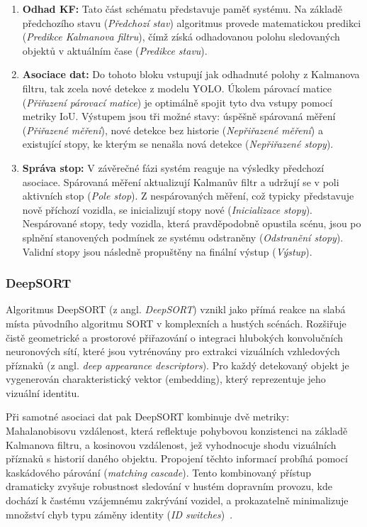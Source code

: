 \documentclass[male,czech,api_bc]{kitheses}
\begin{document}
\begin{enumerate}
    \item \textbf{Odhad KF:} Tato část schématu představuje paměť systému. Na základě předchozího stavu (\textit{Předchozí stav}) algoritmus provede matematickou predikci (\textit{Predikce Kalmanova filtru}), čímž získá odhadovanou polohu sledovaných objektů v aktuálním čase (\textit{Predikce stavu}).
    \item \textbf{Asociace dat:} Do tohoto bloku vstupují jak odhadnuté polohy z Kalmanova filtru, tak zcela nové detekce z modelu YOLO. Úkolem párovací matice (\textit{Přiřazení párovací matice}) je optimálně spojit tyto dva vstupy pomocí metriky \acs{IoU}. Výstupem jsou tři možné stavy: úspěšně spárovaná měření (\textit{Přiřazené měření}), nové detekce bez historie (\textit{Nepřiřazené měření}) a existující stopy, ke kterým se nenašla nová detekce (\textit{Nepřiřazené stopy}).
    \item \textbf{Správa stop:} V závěrečné fázi systém reaguje na výsledky předchozí asociace. Spárovaná měření aktualizují Kalmanův filtr a udržují se v poli aktivních stop (\textit{Pole stop}). Z nespárovaných měření, což typicky představuje nově příchozí vozidla, se inicializují stopy nové (\textit{Inicializace stopy}). Nespárované stopy, tedy vozidla, která pravděpodobně opustila scénu, jsou po splnění stanovených podmínek ze systému odstraněny (\textit{Odstranění stopy}). Validní stopy jsou následně propuštěny na finální výstup (\textit{Výstup}).
\end{enumerate}

\subsubsection{DeepSORT}
Algoritmus DeepSORT (z angl. \textit{\acl{DeepSORT}}) vznikl jako přímá reakce na slabá místa původního algoritmu SORT v komplexních a hustých scénách. Rozšiřuje čistě geometrické a prostorové přiřazování o integraci hlubokých konvolučních neuronových sítí, které jsou vytrénovány pro extrakci vizuálních vzhledových příznaků (z angl. \textit{deep appearance descriptors}). Pro každý detekovaný objekt je vygenerován charakteristický vektor (embedding), který reprezentuje jeho vizuální identitu.

Při samotné asociaci dat pak DeepSORT kombinuje dvě metriky: Mahalanobisovu vzdálenost, která reflektuje pohybovou konzistenci na základě Kalmanova filtru, a kosinovou vzdálenost, jež vyhodnocuje shodu vizuálních příznaků s historií daného objektu. Propojení těchto informací probíhá pomocí kaskádového párování (\textit{matching cascade}). Tento kombinovaný přístup dramaticky zvyšuje robustnost sledování v hustém dopravním provozu, kde dochází k častému vzájemnému zakrývání vozidel, a prokazatelně minimalizuje množství chyb typu záměny identity (\textit{\acs{ID} switches})~\cite{wojke_deepsort_2017}.
\end{document}
